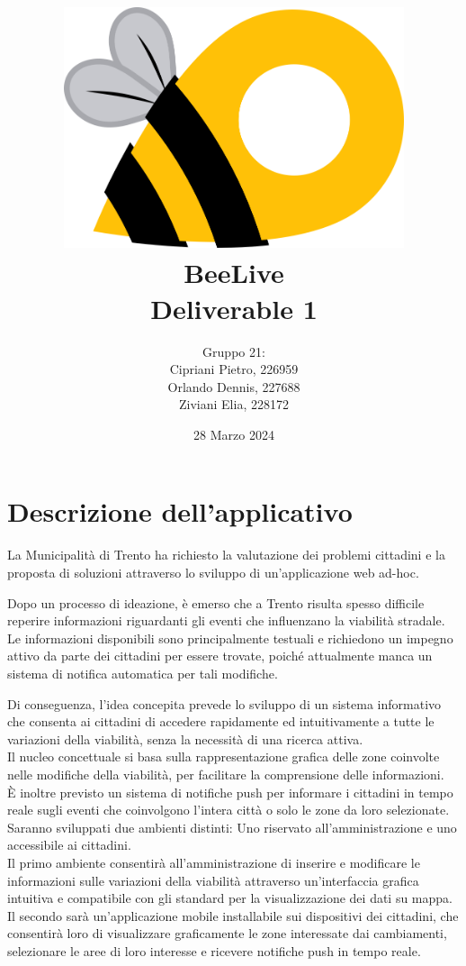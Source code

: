 \documentclass{article}
\title{\includegraphics[width=0.75\textwidth]{Images/BeeLive-Logo.png}\\\vspace{100pt}
\LARGE{\textbf{BeeLive\\Deliverable 1}}}
\author{Gruppo 21:\\
Cipriani Pietro, 226959\\
Orlando Dennis, 227688\\
Ziviani Elia, 228172}
\date{28 Marzo 2024}
\begin{document}
\maketitle
\thispagestyle{firstpage} %
\clearpage

\pagestyle{nonplain} %

\renewcommand{\contentsname}{Indice}
\tableofcontents

\clearpage
\section{Descrizione dell'applicativo}
La Municipalità di Trento ha richiesto la valutazione dei problemi cittadini e la proposta di soluzioni attraverso lo sviluppo di un'applicazione web ad-hoc.

Dopo un processo di ideazione, è emerso che a Trento risulta spesso difficile reperire informazioni riguardanti gli eventi che influenzano la viabilità stradale. Le informazioni disponibili sono principalmente testuali e richiedono un impegno attivo da parte dei cittadini per essere trovate, poiché attualmente manca un sistema di notifica automatica per tali modifiche.

Di conseguenza, l'idea concepita prevede lo sviluppo di un sistema informativo che consenta ai cittadini di accedere rapidamente ed intuitivamente a tutte le variazioni della viabilità, senza la necessità di una ricerca attiva.\\

Il nucleo concettuale si basa sulla rappresentazione grafica delle zone coinvolte nelle modifiche della viabilità, per facilitare la comprensione delle informazioni.\\
È inoltre previsto un sistema di notifiche push per informare i cittadini in tempo reale sugli eventi che coinvolgono l'intera città o solo le zone da loro selezionate.\\

Saranno sviluppati due ambienti distinti: Uno riservato all'amministrazione e uno accessibile ai cittadini.\\
Il primo ambiente consentirà all'amministrazione di inserire e modificare le informazioni sulle variazioni della viabilità attraverso un'interfaccia grafica intuitiva e compatibile con gli standard per la visualizzazione dei dati su mappa.\\
Il secondo sarà un'applicazione mobile installabile sui dispositivi dei cittadini, che consentirà loro di visualizzare graficamente le zone interessate dai cambiamenti, selezionare le aree di loro interesse e ricevere notifiche push in tempo reale.
\end{document}
